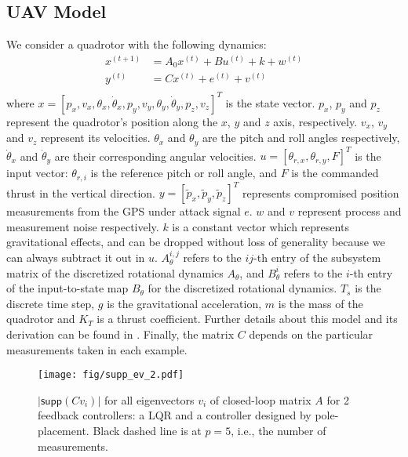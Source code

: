 \documentclass[twocolumn]{autart}    %
\begin{document}
\subsection{UAV Model}
\vspace{-0.4cm}
We consider a quadrotor with the following dynamics:
\begin{equation}
\begin{aligned}
x^{(t+1)} &= A_0 x^{(t)} + B u^{(t)}  + k + w^{(t)} \\
y^{(t)} &= C x^{(t)} + e^{(t)} + v^{(t)} \\
\end{aligned}
\end{equation}
where $x = [p_x, v_x, \theta_x, \dot \theta_x, p_y, v_y, \theta_y, \dot\theta_y, p_z, v_z]^T$ is the state vector. $p_x$, $p_y$ and $p_z$ represent the quadrotor's position along the $x$, $y$ and $z$ axis, respectively. $v_x$, $v_y$ and $v_z$ represent its velocities. $\theta_x$ and $\theta_y$ are the pitch and roll angles respectively, $\dot \theta_x$ and $\dot \theta_y$ are their corresponding angular velocities. %
$u = [\theta_{r,x}, \theta_{r,y}, F]^T$ is the input vector: $\theta_{r,i}$ is the reference pitch or roll angle, and $F$ is the commanded thrust in the vertical direction. $y = [\tilde{p}_x, \tilde{p}_y, \tilde{p}_z]^T$ %
represents compromised position measurements from the GPS under attack signal $e$. $w$ and $v$ represent process and measurement noise respectively. $k$ is a constant vector which represents gravitational effects, and can be dropped without loss of generality because we can always subtract it out in $u$. $A_\theta^{i,j}$ refers to the $ij$-th entry of the subsystem matrix of the discretized rotational dynamics $A_\theta$, and $B_\theta^i$ refers to the $i$-th entry of the input-to-state map $B_\theta$ for the discretized rotational dynamics. $T_s$ is the discrete time step, $g$ is the gravitational acceleration, $m$ is the mass of the quadrotor and $K_T$ is a thrust coefficient. Further details about this model and its derivation can be found in \cite{Bouffard}. Finally, the matrix $C$ depends on the particular measurements taken in each example.
\begin{figure}[b]
\center
\texttt{[image: fig/supp\_ev\_2.pdf]}
\caption{$ \lvert \textsf{supp} (C v_i) \rvert $ for all eigenvectors $v_i$ of closed-loop matrix $A$ for 2 feedback controllers: a LQR and a controller designed by pole-placement. Black dashed line is at $p = 5$, i.e., the number of measurements.}
\label{fig:ex_pole}
\end{figure}
\vspace{-0.4cm}
\end{document}
